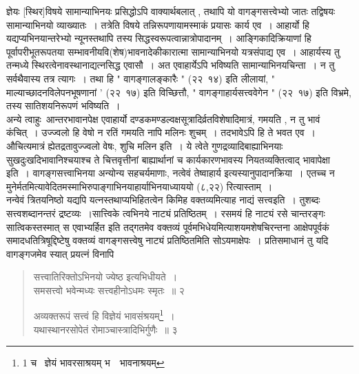 \documentclass[11pt, openany]{book}
\begin{document}
\vspace{2mm}
\noindent
ज्ञेयः [स्थिर]विषये सामान्याभिनयः प्रसिद्धोऽपि वाक्यार्थबलात् , तथापि यो वागङ्गसत्त्वेभ्यो जातः तद्विषयः सामान्याभिनयो व्याख्यातः~। तत्रेति विषये तन्निरूपणायामस्माकं प्रयासः कार्य एव~। आहार्यो हि यद्यप्यभिनयान्तरेभ्यो न्यूनस्तथापि तस्य सिद्धस्वरूपत्वान्नात्रोपादानम्~। आङ्गिकादिक्रियाणां हि पूर्वापरीभूतरूपतया सम्भावनीयवि(शेष)भावनादेकीकारात्मा सामान्याभिनयो यत्रसंपाद्य एव~। आहार्यस्य तु तन्मध्ये स्थिरत्वेनावस्थानाद्यत्नसिद्ध एवासौ~। अत एवाहार्येऽपि भविष्यति सामान्याभिनयचिन्ता~। न तु सर्वथैवास्य तत्र त्यागः~। तथा हि " वागङ्गालङ्कारैः " (२२\textendash\ १४) इति लीलायां, " माल्याच्छादनविलेपनभूषणानां ' (२२\textendash\ १७) इति विच्छित्तौ, " वागङ्गाहार्यसत्त्ववेगेन " (२२\textendash\ १७) इति विभ्रमे, तस्य सातिशयनिरूपणं भविष्यति~। \\

अन्ये त्वाहुः\textendash\ आन्तरभावानपेक्ष एवाहार्यो दण्डकमण्डल्वक्षसूत्रादिर्व्रतविशेषादिमात्रं, गमयति , न तु भावं कंचित्~। उज्ज्वलो हि वेषो न रतिं गमयति नापि मलिनः शुचम्~। तदभावेऽपि हि ते भवत एव~। औचित्यमात्रं ह्येतद्रतावुज्ज्वलो वेषः, शुचि मलिन इति~। ये त्वेते गुणद्रव्यादिबाह्याभिनयाः सुखदुःखदिभावानिश्चयाश्च ते चित्तवृत्तीनां बाह्यार्थानां च कार्यकारणभावस्य नियतव्यक्तित्वाद् भावापेक्षा इति~। वागङ्गसत्त्वाभिनया अन्योन्य सहचर्यमाणाः, नत्वेवं तेष्वाहार्य इत्यस्यानुपादानक्रिया~। एतच्च न मुनेर्मतमित्यावेदितमस्माभिरुपाङ्गाभिनयाहार्याभिनयाध्याययो (८,२२) रित्यास्ताम्~।\\

नन्वेवं त्रितयनिष्ठो यद्यपि यत्नस्तथाप्यभिहितत्वेन किमिह वक्तव्यमित्याह नाद्यं सत्त्वइति~। तुशब्दः सत्त्वशब्दानन्तरं द्रष्टव्यः~।सात्त्विके त्वभिनये नाट्यं प्रतिष्ठितम्~। रसमयं हि नाट्यं रसे चान्तरङ्गः सात्विकस्तस्मात् स एवाभ्यर्हित इति तद्गतमेव वक्तव्यं पूर्वमभिधेयमित्याशयमशेषचिरन्तना आक्षेपपूर्वकं समादधतित्रिषूद्दिष्टेषु वक्तव्यं वागङ्गसत्त्वेषु नाट्यं प्रतिष्ठितमिति सोऽयमाक्षेपः~। प्रतिसमाधानं तु यदि वागङ्गजमेव स्यात् प्रयत्नं विनापि 


\newpage

\begin{quote}
 {\na सत्त्वातिरिक्तोऽभिनयो ज्येष्ठ इत्यभिधीयते~। \\
 समसत्त्वो भवेन्मध्यः सत्त्वहीनोऽधमः स्मृतः~॥ २ 

 अव्यक्तरूपं सत्त्वं हि विज्ञेयं भावसंश्रयम्\renewcommand{\thefootnote}{1}\footnote{1 च \textendash\ ज्ञेयं भावरसाश्रयम् भ\textendash\ \textendash\ भावनाश्रयम् }~।\\
 यथास्थानरसोपेतं रोमाञ्चास्त्रादिभिर्गुणैः~॥ ३ }
\end{quote}
\end{document}
